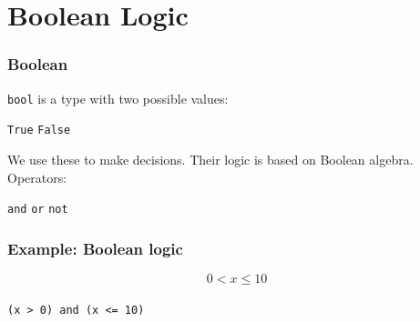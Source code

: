 \documentclass[11pt]{beamer}
\begin{document}
\section{Boolean Logic}

\begin{frame}[fragile]
  \frametitle{Boolean}
  \Enlarge

  \begin{itemize}
  \myitem  \texttt{bool} is a type with two possible values:
    \begin{itemize}
    \mysubitem  \texttt{True}
    \mysubitem  \texttt{False}
    \end{itemize} %
  \myitem  We use these to make decisions.
  \myitem  Their logic is based on Boolean algebra. %
  \myitem  Operators:
    \begin{itemize}
    \mysubitem  \texttt{and}
    \mysubitem  \texttt{or}
    \mysubitem  \texttt{not}
    \end{itemize}
  \end{itemize}
\end{frame}

\begin{frame}[fragile]
  \frametitle{Example:  Boolean logic}
  \Enlarge

  \begin{center}
  $$
  0 < x \leq 10
  $$
  \\
  \texttt{(x > 0) and (x <= 10)}
  \end{center}
\end{frame}
\end{document}
